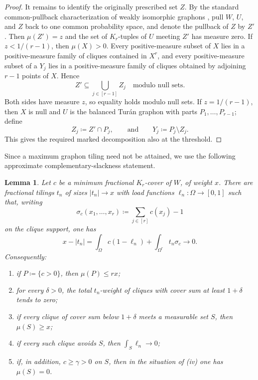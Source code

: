 \documentclass[10pt]{article}
\numberwithin{equation}{section}
\newtheorem{lemma}[lemma]{Lemma}
\begin{document}
\begin{proof}
It remains to identify the originally prescribed set $Z$.  By the standard common-pullback characterization of weakly isomorphic graphons \cite{Lovasz}, pull $W$, $U$, and $Z$ back to one common probability space, and denote the pullback of $Z$ by $Z'$.  Then $\mu(Z')=z$ and the set of $K_r$-tuples of $U$ meeting $Z'$ has measure zero.  If $z<1/(r-1)$, then $\mu(X)>0$.  Every positive-measure subset of $X$ lies in a positive-measure family of cliques contained in $X^r$, and every positive-measure subset of a $Y_j$ lies in a positive-measure family of cliques obtained by adjoining $r-1$ points of $X$.  Hence
\[
 Z'\subseteq\bigcup_{j\in[r-1]}Z_j
 \quad\text{modulo null sets}.
\]
Both sides have measure $z$, so equality holds modulo null sets.  If $z=1/(r-1)$, then $X$ is null and $U$ is the balanced Tur\'an graphon with parts $P_1,\ldots,P_{r-1}$; define
\[
 Z_j\coloneqq Z'\cap P_j,
 \qquad\text{and}\qquad
 Y_j\coloneqq P_j\setminus Z_j.
\]
This gives the required marked decomposition also at the threshold.
\end{proof}

Since a maximum graphon tiling need not be attained, we use the following approximate complementary-slackness statement.

\begin{lemma}\label{lem:approx-CS}
Let $c$ be a minimum fractional $K_r$-cover of $W$, of weight $x$.  There are fractional tilings $t_n$ of sizes $|t_n|\to x$ with load functions $\ell_n:\Omega\to[0,1]$ such that, writing
\[
 \sigma_c(x_1,\ldots,x_r)\coloneqq\sum_{j\in[r]}c(x_j)-1
\]
on the clique support, one has
\begin{equation}\label{eq:CS-identity}
 x-|t_n|
 =\int_\Omega c(1-\ell_n)
 +\int_{\Omega^r}t_n\sigma_c
 \longrightarrow0.
\end{equation}
Consequently:
\begin{enumerate}[label=\textup{(\roman*)}]
\item if $P\coloneqq\{c>0\}$, then $\mu(P)\le rx$;
\item for every $\delta>0$, the total $t_n$-weight of cliques with cover sum at least $1+\delta$ tends to zero;
\item if every clique of cover sum below $1+\delta$ meets a measurable set $S$, then $\mu(S)\ge x$;
\item if every such clique avoids $S$, then $\int_S\ell_n\to0$;
\item if, in addition, $c\ge\gamma>0$ on $S$, then in the situation of \textup{(iv)} one has $\mu(S)=0$.
\end{enumerate}
\end{lemma}
\end{document}
